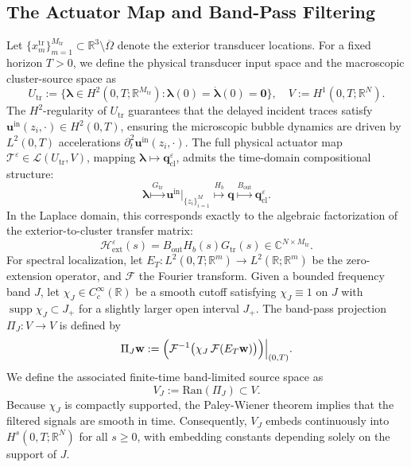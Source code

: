 \documentclass[11pt,a4paper]{article}
\numberwithin{equation}{section}
\begin{document}
\subsection{The Actuator Map and Band-Pass Filtering}
\noindent
Let $\{x_m^{\mathrm{tr}}\}_{m=1}^{M_{\mathrm{tr}}}\subset\mathbb{R}^3\setminus \overline{\Omega}$ denote the exterior transducer locations. For a fixed horizon $T>0$, we define the physical transducer input space and the macroscopic cluster-source space as
\[
   U_{\mathrm{tr}}:=\{\boldsymbol{\lambda}\in H^2(0,T;\mathbb{R}^{M_{\mathrm{tr}}}):\boldsymbol{\lambda}(0)=\dot{\boldsymbol{\lambda}}(0)=\mathbf{0}\}, \quad V:=H^1(0,T;\mathbb{R}^N).
\]
The $H^2$-regularity of $U_{\mathrm{tr}}$ guarantees that the delayed incident traces satisfy $\mathbf{u}^{\mathrm{in}}(z_i,\cdot)\in H^2(0,T)$, ensuring the microscopic bubble dynamics are driven by $L^2(0,T)$ accelerations $\partial_t^2\mathbf{u}^{\mathrm{in}}(z_i,\cdot)$. 
\newline
The full physical actuator map $\mathcal{T}^\varepsilon \in \mathcal{L}(U_{\mathrm{tr}}, V)$, mapping $\boldsymbol{\lambda} \mapsto \mathbf{q}_{\mathrm{cl}}^\varepsilon$, admits the time-domain compositional structure:
\[
 \boldsymbol{\lambda} \overset{G_{\mathrm{tr}}}{\longmapsto} \mathbf{u}^{\mathrm{in}}\big|_{\{z_i\}_{i=1}^M}
 \overset{H_b}{\longmapsto} \mathbf{q}
 \overset{B_{\mathrm{out}}}{\longmapsto} \mathbf{q}_{\mathrm{cl}}^\varepsilon.
\]
In the Laplace domain, this corresponds exactly to the algebraic factorization of the exterior-to-cluster transfer matrix:
\begin{equation}
    \mathcal{H}_{\mathrm{ext}}^\varepsilon(s) = B_{\mathrm{out}} H_b(s) G_{\mathrm{tr}}(s) \in \mathbb{C}^{N \times M_{\mathrm{tr}}}.
\end{equation}
For spectral localization, let $E_T: L^2(0,T;\mathbb{R}^m)\to L^2(\mathbb{R};\mathbb{R}^m)$ be the zero-extension operator, and $\mathcal{F}$ the Fourier transform. Given a bounded frequency band $J$, let $\chi_J\in C_c^\infty(\mathbb{R})$ be a smooth cutoff satisfying $\chi_J\equiv 1$ on $J$ with $\operatorname{supp}\chi_J\subset J_+$ for a slightly larger open interval $J_+$. The band-pass projection $\Pi_J: V \to V$ is defined by
\[
 \Pi_J \mathbf{w} := \Bigl(\mathcal{F}^{-1}\bigl(\chi_J\,\mathcal{F}(E_T \mathbf{w})\bigr)\Bigr)\Big|_{(0,T)}.
\]
We define the associated finite-time band-limited source space as
\[
    V_J := \mathrm{Ran}(\Pi_J)\subset V.
\]
Because $\chi_J$ is compactly supported, the Paley-Wiener theorem implies that the filtered signals are smooth in time. Consequently, $V_J$ embeds continuously into $H^s(0,T;\mathbb{R}^N)$ for all $s \ge 0$, with embedding constants depending solely on the support of $J$.
\end{document}
